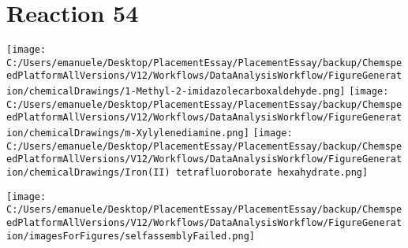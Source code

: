\documentclass{article}%
\begin{document}
\section*{Reaction 54}%
%
\begin{scheme}[H]%
\begin{minipage}{0.5\textwidth}%
\texttt{[image: C:/Users/emanuele/Desktop/PlacementEssay/PlacementEssay/backup/ChemspeedPlatformAllVersions/V12/Workflows/DataAnalysisWorkflow/FigureGeneration/chemicalDrawings/1-Methyl-2-imidazolecarboxaldehyde.png]}%
\texttt{[image: C:/Users/emanuele/Desktop/PlacementEssay/PlacementEssay/backup/ChemspeedPlatformAllVersions/V12/Workflows/DataAnalysisWorkflow/FigureGeneration/chemicalDrawings/m-Xylylenediamine.png]}%
\texttt{[image: C:/Users/emanuele/Desktop/PlacementEssay/PlacementEssay/backup/ChemspeedPlatformAllVersions/V12/Workflows/DataAnalysisWorkflow/FigureGeneration/chemicalDrawings/Iron(II) tetrafluoroborate hexahydrate.png]}%
\end{minipage}%
\begin{minipage}{0.5\textwidth}%
\begin{center}%
\texttt{[image: C:/Users/emanuele/Desktop/PlacementEssay/PlacementEssay/backup/ChemspeedPlatformAllVersions/V12/Workflows/DataAnalysisWorkflow/FigureGeneration/imagesForFigures/selfassemblyFailed.png]}%
\end{center}%
\end{minipage}%
\caption{Self-assembly of components 12, 18, with Iron(II) in a 3.0:1.5:1.0 molar ratio in CH$_3$CN at 60\textdegree C for 40h. These are the reagents (starting materials) for reaction 54.}%
\end{scheme}%
\end{document}
